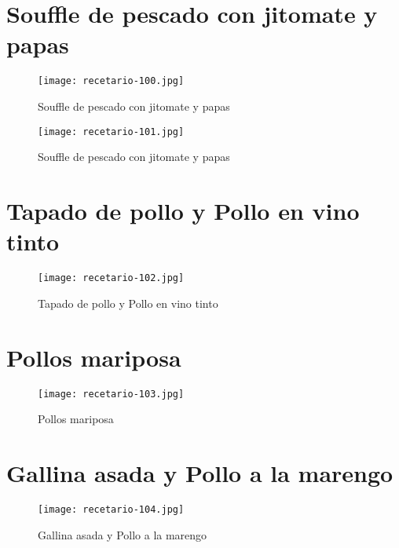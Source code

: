 \documentclass[12pt,letterpaper]{article}
\begin{document}
\newpage

\section{Souffle de pescado con jitomate y papas}
  \begin{figure}[H]
    \vspace{2pt}
  \texttt{[image: recetario-100.jpg]}
    \caption{Souffle de pescado con jitomate y papas}
    
  \end{figure}

\newpage

  
    \begin{figure}[H]
      \vspace{2pt}
    \texttt{[image: recetario-101.jpg]}
      \caption{Souffle de pescado con jitomate y papas}
      
    \end{figure}
  
\newpage

\section{Tapado de pollo y Pollo en vino tinto}
  \begin{figure}[H]
    \vspace{2pt}
  \texttt{[image: recetario-102.jpg]}
    \caption{Tapado de pollo y Pollo en vino tinto}
    
  \end{figure}

\newpage

\section{Pollos mariposa}
  \begin{figure}[H]
    \vspace{2pt}
  \texttt{[image: recetario-103.jpg]}
    \caption{Pollos mariposa}
    
  \end{figure}

\newpage

\section{Gallina asada y Pollo a la marengo}
  \begin{figure}[H]
    \vspace{2pt}
  \texttt{[image: recetario-104.jpg]}
    \caption{Gallina asada y Pollo a la marengo}
    
  \end{figure}
\end{document}
